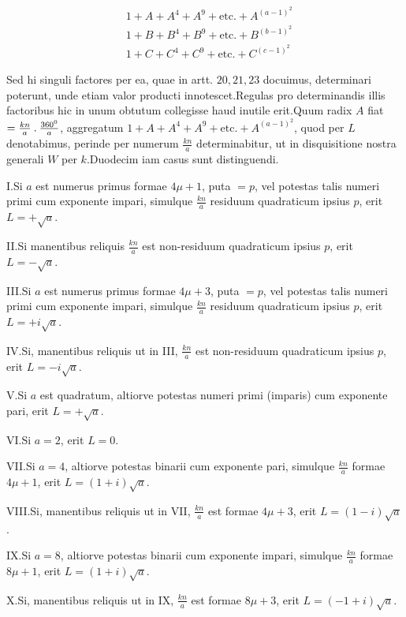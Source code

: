 \[
\begin{aligned}
&1+A+A^4+A^9+\text{etc.}+A^{(a-1)^2}\\
&1+B+B^4+B^9+\text{etc.}+B^{(b-1)^2}\\
&1+C+C^4+C^9+\text{etc.}+C^{(c-1)^2}
\end{aligned}
\]

Sed hi singuli factores per ea, quae in artt. $20,21,23$ docuimus, determinari poterunt, unde etiam valor producti innotescet.\quad Regulas pro determinandis illis factoribus hic in unum obtutum collegisse haud inutile erit.\quad Quum radix $A$ fiat $=\frac{kn}{a}\mathbin{.}\frac{360^0}{a}$, aggregatum $1+A+A^4+A^9+\text{etc.}+A^{(a-1)^2}$, quod per $L$ denotabimus, perinde per numerum $\frac{kn}{a}$ determinabitur, ut in disquisitione nostra generali $W$ per $k$.\quad Duodecim iam casus sunt distinguendi.

I.\quad Si $a$ est numerus primus formae $4\mu+1$, puta $=p$, vel potestas talis numeri primi cum exponente impari, simulque $\frac{kn}{a}$ residuum quadraticum ipsius $p$, erit $L=+\surd a$.

II.\quad Si manentibus reliquis $\frac{kn}{a}$ est non-residuum quadraticum ipsius $p$, erit $L=-\surd a$.

III.\quad Si $a$ est numerus primus formae $4\mu+3$, puta $=p$, vel potestas talis numeri primi cum exponente impari, simulque $\frac{kn}{a}$ residuum quadraticum ipsius $p$, erit $L=+i\surd a$.

IV.\quad Si, manentibus reliquis ut in III, $\frac{kn}{a}$ est non-residuum quadraticum ipsius $p$, erit $L=-i\surd a$.

V.\quad Si $a$ est quadratum, altiorve potestas numeri primi (imparis) cum exponente pari, erit $L=+\surd a$.

VI.\quad Si $a=2$, erit $L=0$.

VII.\quad Si $a=4$, altiorve potestas binarii cum exponente pari, simulque $\frac{kn}{a}$ formae $4\mu+1$, erit $L=(1+i)\surd a$.

VIII.\quad Si, manentibus reliquis ut in VII, $\frac{kn}{a}$ est formae $4\mu+3$, erit $L=(1-i)\surd a$.

IX.\quad Si $a=8$, altiorve potestas binarii cum exponente impari, simulque $\frac{kn}{a}$ formae $8\mu+1$, erit $L=(1+i)\surd a$.

%
X.\quad Si, manentibus reliquis ut in IX, $\frac{kn}{a}$ est formae $8\mu+3$, erit $L=(-1+i)\surd a$.

